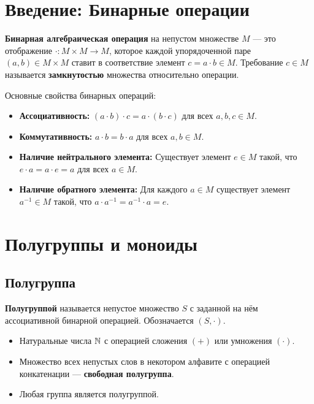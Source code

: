 \documentclass[10pt]{article}
\begin{document}
\section{Введение: Бинарные операции}
\begin{definition}
\textbf{Бинарная алгебраическая операция} на непустом множестве $M$ — это отображение $\cdot: M \times M \to M$, которое каждой упорядоченной паре $(a,b) \in M \times M$ ставит в соответствие элемент $c = a \cdot b \in M$. Требование $c \in M$ называется \textbf{замкнутостью} множества относительно операции.
\end{definition}

Основные свойства бинарных операций:
\begin{itemize}
    \item \textbf{Ассоциативность:} $(a \cdot b) \cdot c = a \cdot (b \cdot c)$ для всех $a,b,c \in M$.
    \item \textbf{Коммутативность:} $a \cdot b = b \cdot a$ для всех $a,b \in M$.
    \item \textbf{Наличие нейтрального элемента:} Существует элемент $e \in M$ такой, что $e \cdot a = a \cdot e = a$ для всех $a \in M$.
    \item \textbf{Наличие обратного элемента:} Для каждого $a \in M$ существует элемент $a^{-1} \in M$ такой, что $a \cdot a^{-1} = a^{-1} \cdot a = e$.
\end{itemize}

\section{Полугруппы и моноиды}

\subsection{Полугруппа}
\begin{definition}
\textbf{Полугруппой} называется непустое множество $S$ с заданной на нём ассоциативной бинарной операцией. Обозначается $(S, \cdot)$.
\end{definition}

\begin{example}
    \begin{itemize}
        \item Натуральные числа $\mathbb{N}$ с операцией сложения $(+)$ или умножения $(\cdot)$.
        \item Множество всех непустых слов в некотором алфавите с операцией конкатенации — \textbf{свободная полугруппа}.
        \item Любая группа является полугруппой.
    \end{itemize}
\end{example}
\end{document}

